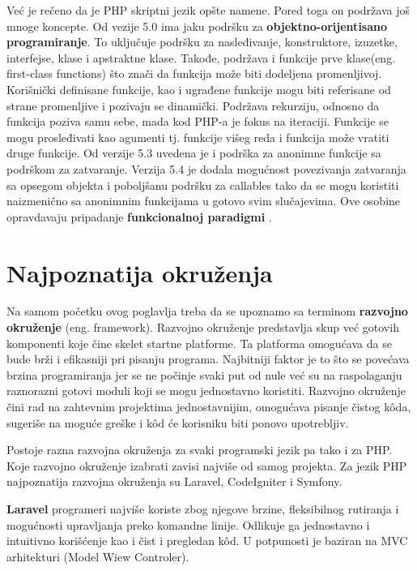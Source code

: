 \documentclass[a4paper]{article}
\begin{document}
{Već je rečeno da je PHP skriptni jezik opšte namene. Pored toga on podržava još mnoge koncepte. Od vezije 5.0 ima jaku podršku za \textbf{objektno-orijentisano programiranje}. To uključuje podršku za nasleđivanje, konstruktore, izuzetke, interfejse, klase i apstraktne klase. Takođe, podržava i funkcije prve klase(eng. first-class functions) što znači da funkcija može biti dodeljena promenljivoj. Korišnički definisane funkcije, kao i ugrađene funkcije mogu biti referisane od strane promenljive i pozivaju se dinamički. Podržava rekurziju, odnosno da funkcija poziva samu sebe, mada kod PHP-a je fokus na iteraciji. Funkcije se mogu prosleđivati kao agumenti tj. funkcije višeg reda i funkcija može vratiti druge funkcije. Od verzije 5.3 uvedena je i podrška za anonimne funkcije sa podrškom za zatvaranje. Verzija 5.4 je dodala mogućnost povezivanja zatvaranja sa opsegom objekta i poboljšanu podršku za callables tako da se mogu koristiti naizmenično sa anonimnim funkcijama u gotovo svim slučajevima. Ove osobine opravdavaju pripadanje \textbf{funkcionalnoj paradigmi} \cite{phpSrbija}. 

\section{Najpoznatija okruženja}
Na samom početku ovog poglavlja treba da se upoznamo sa terminom \textbf{razvojno okruženje} (eng. framework). Razvojno okruženje predstavlja skup već gotovih komponenti koje čine skelet startne platforme. Ta platforma omogućava da se bude brži i efikasniji pri pisanju programa. Najbitniji faktor je to što se povećava brzina programiranja jer se ne počinje svaki put od nule već su na raspolaganju raznorazni gotovi moduli koji se mogu jednostavno koristiti. Razvojno okruženje čini rad na zahtevnim projektima jednostavnijim, omogućava pisanje čistog k\^{o}da, sugeriše na moguće greške i k\^{o}d će korisniku biti ponovo upotrebljiv.

Postoje razna razvojna okruženja za svaki programski jezik pa tako i za PHP. Koje razvojno okruženje izabrati zavisi najviše od samog projekta. Za jezik PHP najpoznatija razvojna okruženja su Laravel\cite{laravel}, CodeIgniter\cite{codeigniter} i Symfony\cite{symfony}.

\textbf{Laravel} programeri najviše koriste zbog njegove brzine, fleksibilnog rutiranja i mogućnosti upravljanja preko komandne linije. Odlikuje ga jednostavno i intuitivno korišćenje kao i čist i pregledan k\^{o}d. U potpunosti je baziran na MVC arhitekturi (Model Wiew Controler).

}
\end{document}
